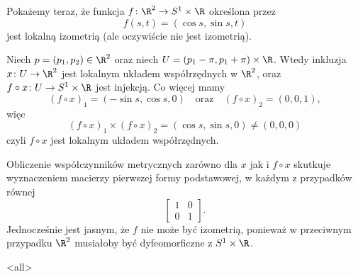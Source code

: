 \begin{frame}
Pokażemy teraz, że funkcja $f\colon \R^2\to S^1\times \R$ określona przez 
\[f(s,t)=(\cos s,\sin s,t)\]
jest lokalną izometrią (ale oczywiście nie jest izometrią).

\pause Niech $p=(p_1,p_2)\in \R^2$ oraz niech $U=(p_1-\pi,p_1+\pi)\times \R$. Wtedy inkluzja $x\colon U\to \R^2$ jest lokalnym układem współrzędnych w $\R^2$, oraz $f\circ x\colon U\to S^1\times \R$ jest injekcją. \pause Co więcej mamy
\[(f\circ x)_1=(-\sin s, \cos s, 0)\quad\text{oraz}\quad(f\circ x)_2=(0,0,1), \]
więc \[(f\circ x)_1\times (f\circ x)_2=(\cos s, \sin s,0)\neq (0,0,0)\]
czyli $f\circ x$ jest lokalnym układem współrzędnych. 
\end{frame}
\begin{frame}
\pause Obliczenie współczynników metrycznych zarówno dla $x$ jak i $f\circ x$ skutkuje wyznaczeniem macierzy pierwszej formy podstawowej, w każdym z przypadków równej
\[
\left[
\begin{array}{cc}
1 & 0\\
0 & 1
\end{array}\right]
.\]
\pause Jednocześnie jest jasnym, że $f$ nie może być izometrią, ponieważ w przeciwnym przypadku $\R^2$ musiałoby być dyfeomorficzne z $S^1\times \R$.
\end{frame}

\mode<all> 
